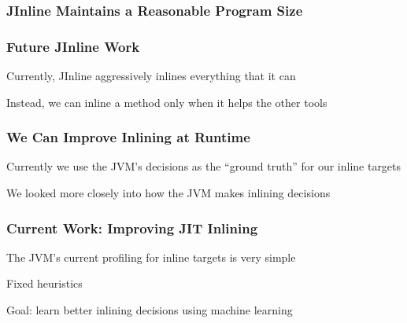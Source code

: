 \documentclass[aspectratio=169]{beamer}
\begin{document}
  \begin{frame}
    \frametitle{JInline Maintains a Reasonable Program Size}

    \centering
  \end{frame}

  \begin{frame}
    \frametitle{Future JInline Work}

    Currently, JInline aggressively inlines everything that it can

    \vspace{2em}

    Instead, we can inline a method only when it helps the other tools
  \end{frame}

  \begin{frame}
    \frametitle{We Can Improve Inlining at Runtime}

    Currently we use the JVM's decisions as the ``ground truth'' for our inline
    targets

    \vspace{2em}

    We looked more closely into how the JVM makes inlining decisions
  \end{frame}

  \begin{frame}
    \frametitle{Current Work: Improving JIT Inlining}
    The JVM's current profiling for inline targets is very simple

    \hspace{1em} Fixed heuristics

    \vspace{2em}

    Goal: learn better inlining decisions using machine learning
  \end{frame}
\end{document}
